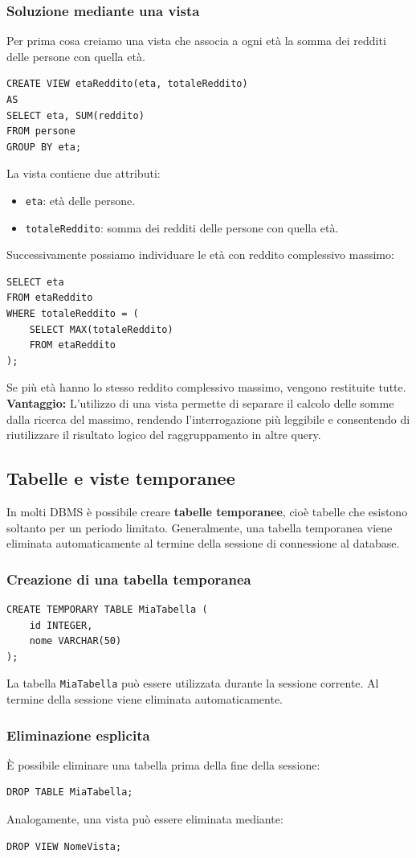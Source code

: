 \subsubsection*{Soluzione mediante una vista}
Per prima cosa creiamo una vista che associa
a ogni età la somma dei redditi delle persone
con quella età.
\begin{verbatim}
CREATE VIEW etaReddito(eta, totaleReddito)
AS
SELECT eta, SUM(reddito)
FROM persone
GROUP BY eta;
\end{verbatim}
La vista contiene due attributi:
\begin{itemize}
    \item \texttt{eta}: età delle persone.
    \item \texttt{totaleReddito}: somma dei redditi
    delle persone con quella età.
\end{itemize}
Successivamente possiamo individuare le età
con reddito complessivo massimo:
\begin{verbatim}
SELECT eta
FROM etaReddito
WHERE totaleReddito = (
    SELECT MAX(totaleReddito)
    FROM etaReddito
);
\end{verbatim}
\noindent Se più età hanno lo stesso reddito complessivo
massimo, vengono restituite tutte.
\medskip\\
\noindent
\textbf{Vantaggio:}
L'utilizzo di una vista permette di separare
il calcolo delle somme dalla ricerca del massimo,
rendendo l'interrogazione più leggibile
e consentendo di riutilizzare il risultato logico
del raggruppamento in altre query.
\subsection{Tabelle e viste temporanee}
In molti DBMS è possibile creare
\textbf{tabelle temporanee}, cioè tabelle
che esistono soltanto per un periodo limitato.
Generalmente, una tabella temporanea viene
eliminata automaticamente al termine della
sessione di connessione al database.
\subsubsection*{Creazione di una tabella temporanea}
\begin{verbatim}
CREATE TEMPORARY TABLE MiaTabella (
    id INTEGER,
    nome VARCHAR(50)
);
\end{verbatim}
La tabella \texttt{MiaTabella} può essere
utilizzata durante la sessione corrente.
Al termine della sessione viene eliminata
automaticamente.
\subsubsection*{Eliminazione esplicita}
È possibile eliminare una tabella prima
della fine della sessione:
\begin{verbatim}
DROP TABLE MiaTabella;
\end{verbatim}
Analogamente, una vista può essere eliminata
mediante:
\begin{verbatim}
DROP VIEW NomeVista;
\end{verbatim}

